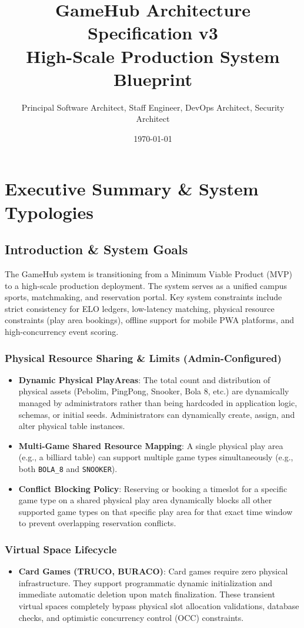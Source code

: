\documentclass[11pt,a4paper]{report}
\title{GameHub Architecture Specification v3\\ \large High-Scale Production System Blueprint}
\author{Principal Software Architect, Staff Engineer, DevOps Architect, Security Architect}
\date{\today}
\begin{document}
\maketitle
\tableofcontents
\newpage


\chapter{Executive Summary \& System Typologies}


\section{Introduction \& System Goals}
The GameHub system is transitioning from a Minimum Viable Product (MVP) to a high-scale production deployment. The system serves as a unified campus sports, matchmaking, and reservation portal. Key system constraints include strict consistency for ELO ledgers, low-latency matching, physical resource constraints (play area bookings), offline support for mobile PWA platforms, and high-concurrency event scoring.

\subsection{Physical Resource Sharing \& Limits (Admin-Configured)}
\begin{itemize}
    \item \textbf{Dynamic Physical PlayAreas}: The total count and distribution of physical assets (Pebolim, PingPong, Snooker, Bola 8, etc.) are dynamically managed by administrators rather than being hardcoded in application logic, schemas, or initial seeds. Administrators can dynamically create, assign, and alter physical table instances.
    \item \textbf{Multi-Game Shared Resource Mapping}: A single physical play area (e.g., a billiard table) can support multiple game types simultaneously (e.g., both \texttt{BOLA\_8} and \texttt{SNOOKER}).
    \item \textbf{Conflict Blocking Policy}: Reserving or booking a timeslot for a specific game type on a shared physical play area dynamically blocks all other supported game types on that specific play area for that exact time window to prevent overlapping reservation conflicts.
\end{itemize}

\subsection{Virtual Space Lifecycle}
\begin{itemize}
    \item \textbf{Card Games (TRUCO, BURACO)}: Card games require zero physical infrastructure. They support programmatic dynamic initialization and immediate automatic deletion upon match finalization. These transient virtual spaces completely bypass physical slot allocation validations, database checks, and optimistic concurrency control (OCC) constraints.
\end{itemize}
\end{document}
